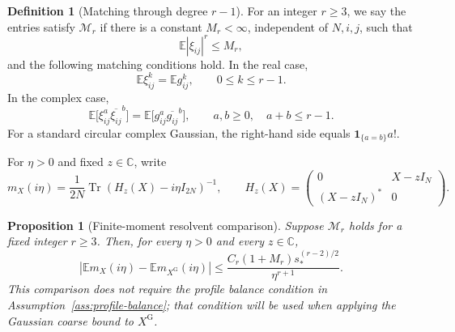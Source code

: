 \documentclass[11pt,reqno]{amsart}
\numberwithin{equation}{section}
\theoremstyle{plain}
\newtheorem{proposition}[theorem]{Proposition}
\theoremstyle{definition}
\newtheorem{definition}[theorem]{Definition}
\theoremstyle{remark}
\begin{document}
\begin{definition}[Matching through degree $r-1$]\label{def:moment-matching}
For an integer $r\ge3$, we say the entries satisfy $\mathcal M_r$ if
there is a constant $M_r<\infty$, independent of $N,i,j$, such that
\[
 \mathbb E|\xi_{ij}|^r\le M_r,
\]
and the following matching conditions hold.  In the real case,
\begin{equation}\label{eq:moment-real-matching}
 \mathbb E\xi_{ij}^k=\mathbb Eg_{ij}^k,
 \qquad 0\le k\le r-1.
\end{equation}
In the complex case,
\begin{equation}\label{eq:moment-complex-matching}
 \mathbb E\bigl[\xi_{ij}^a\overline{\xi_{ij}}^{b}\bigr]
 =\mathbb E\bigl[g_{ij}^a\overline{g_{ij}}^{b}\bigr],
 \qquad a,b\ge0,\quad a+b\le r-1.
\end{equation}
For a standard circular complex Gaussian, the right-hand side equals
$\mathbf1_{\{a=b\}}a!$.
\end{definition}

For $\eta>0$ and fixed $z\in\mathbb C$, write
\[
 m_X(i\eta)=\frac1{2N}\operatorname{Tr}(H_z(X)-i\eta I_{2N})^{-1},
 \qquad H_z(X)=\begin{pmatrix}0&X-zI_N\\(X-zI_N)^*&0\end{pmatrix}.
\]

\begin{proposition}[Finite-moment resolvent comparison]
\label{prop:moment-comparison}
Suppose $\mathcal M_r$ holds for a fixed integer $r\ge3$.  Then, for every
$\eta>0$ and every $z\in\mathbb C$,
\begin{equation}\label{eq:moment-comparison}
 \left|\mathbb Em_X(i\eta)-\mathbb Em_{X^{\mathrm G}}(i\eta)\right|
 \le \frac{C_r(1+M_r)s_*^{(r-2)/2}}{\eta^{r+1}}.
\end{equation}
This comparison does not require the profile balance condition in
Assumption~\ref{ass:profile-balance}; that condition will be used when
applying the Gaussian coarse bound to $X^{\mathrm G}$.
\end{proposition}
\end{document}
